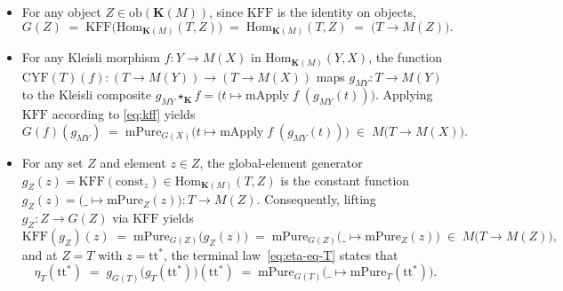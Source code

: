 \documentclass[11pt,a4paper]{article}
\theoremstyle{definition}
\theoremstyle{remark}
\newcommand{\Hom}{\mathrm{Hom}}
\newcommand{\CYF}{\mathrm{CYF}}
\newcommand{\KFF}{\mathrm{KFF}}
\newcommand{\K}{\mathbf{K}}
\newcommand{\ttstar}{\mathrm{tt}^*}
\newcommand{\const}{\mathrm{const}}
\newcommand{\starK}{\mathbin{\star_{\K}}}
\begin{document}
\begin{itemize}[nosep]
  \item For any object $Z \in \mathrm{ob}(\K(M))$, since $\KFF$ is the identity on objects,
  \[
    G(Z) \;=\; \KFF\bigl(\Hom_{\K(M)}(T, Z)\bigr) \;=\; \Hom_{\K(M)}(T, Z) \;=\; \bigl(T \to M(Z)\bigr).
  \]
\vspace{4 pt}  
  \item For any Kleisli morphism $f : Y \to M(X)$ in $\Hom_{\K(M)}(Y, X)$, the function
  $\CYF(T)(f) : (T \to M(Y)) \to (T \to M(X))$ maps $g_{MY} : T \to M(Y)$ to the Kleisli composite
  $g_{MY} \starK f = \bigl(t \mapsto \mathrm{mApply}\;f\;(g_{MY}(t))\bigr)$. Applying $\KFF$ according to
  \eqref{eq:kff} yields
  \begin{equation}\label{eq:kleisli-G-map}
    G(f)(g_{MY}) \;=\; \mathrm{mPure}_{G(X)}\bigl(t \mapsto \mathrm{mApply}\;f\;(g_{MY}(t))\bigr)
    \;\in\; M\bigl(T \to M(X)\bigr).
  \end{equation}
\vspace{4 pt}  
  \item For any set $Z$ and element $z \in Z$, the global-element generator
  $g_Z(z) = \KFF(\const_z) \in \Hom_{\K(M)}(T, Z)$ is the constant function
  $g_Z(z) = \bigl(\_ \mapsto \mathrm{mPure}_Z(z)\bigr) : T \to M(Z)$. Consequently, lifting
  $g_Z : Z \to G(Z)$ via $\KFF$ yields
  \begin{equation}\label{eq:kleisli-kff-g}
    \KFF(g_Z)(z) \;=\; \mathrm{mPure}_{G(Z)}\bigl(g_Z(z)\bigr)
    \;=\; \mathrm{mPure}_{G(Z)}\bigl(\_ \mapsto \mathrm{mPure}_Z(z)\bigr)
    \;\in\; M\bigl(T \to M(Z)\bigr),
  \end{equation}
  and at $Z = T$ with $z = \ttstar$, the terminal law~\eqref{eq:eta-eq-T} states that
  \begin{equation}\label{eq:kleisli-eta-T}
    \eta_T(\ttstar) \;=\; g_{G(T)}\bigl(g_T(\ttstar)\bigr)(\ttstar)
    \;=\; \mathrm{mPure}_{G(T)}\bigl(\_ \mapsto \mathrm{mPure}_T(\ttstar)\bigr).
  \end{equation}
\end{itemize}
\end{document}
